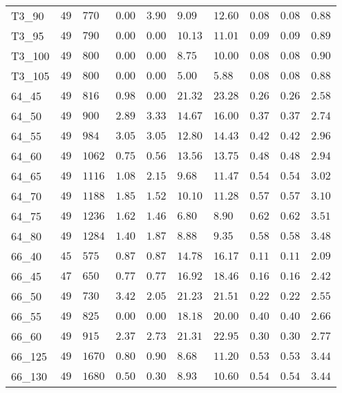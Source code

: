\begin{center}
\begin{table}[]
\begin{adjustwidth}{-0.4in}{-1in}
\begin{tabular}{|lll|l|l|ll|lll|}
T3\_90   & $49  $ & $770 $ & $\bm{0.00}$ & $3.90$ & $9.09$  & $12.60$ & $0.08$ & $0.08$   & $0.88$ \\
T3\_95   & $49  $ & $790 $ & $\bm{0.00}$ & $\bm{0.00}$ & $10.13$ & $11.01$ & $0.09$ & $0.09$   & $0.89$ \\
T3\_100  & $49  $ & $800 $ & $\bm{0.00}$ & $\bm{0.00}$ & $8.75$  & $10.00$ & $0.08$ & $0.08$   & $0.90$ \\
T3\_105  & $49  $ & $800 $ & $\bm{0.00}$ & $\bm{0.00}$ & $5.00$  & $5.88$  & $0.08$ & $0.08$   & $0.88$ \\
\hline
64\_45   & $49  $ & $816 $ & $0.98$ & $\bm{0.00}$ & $21.32$ & $23.28$ & $0.26$ & $0.26$   & $2.58$ \\
64\_50   & $49  $ & $900 $ & $2.89$ & $3.33$ & $14.67$ & $16.00$ & $0.37$ & $0.37$   & $2.74$ \\
64\_55   & $49  $ & $984 $ & $3.05$ & $3.05$ & $12.80$ & $14.43$ & $0.42$ & $0.42$   & $2.96$ \\
64\_60   & $49  $ & $1062$ & $0.75$ & $0.56$ & $13.56$ & $13.75$ & $0.48$ & $0.48$   & $2.94$ \\
64\_65   & $49  $ & $1116$ & $1.08$ & $2.15$ & $9.68$  & $11.47$ & $0.54$ & $0.54$   & $3.02$ \\
64\_70   & $49  $ & $1188$ & $1.85$ & $1.52$ & $10.10$ & $11.28$ & $0.57$ & $0.57$   & $3.10$ \\
64\_75   & $49  $ & $1236$ & $1.62$ & $1.46$ & $6.80$  & $8.90$  & $0.62$ & $0.62$   & $3.51$ \\
64\_80   & $49  $ & $1284$ & $1.40$ & $1.87$ & $8.88$  & $9.35$  & $0.58$ & $0.58$   & $3.48$ \\
\hline
66\_40   & $45  $ & $575 $ & $0.87$ & $0.87$ & $14.78$ & $16.17$ & $0.11$ & $0.11$   & $2.09$ \\
66\_45   & $47  $ & $650 $ & $0.77$ & $0.77$ & $16.92$ & $18.46$ & $0.16$ & $0.16$   & $2.42$ \\
66\_50   & $49  $ & $730 $ & $3.42$ & $2.05$ & $21.23$ & $21.51$ & $0.22$ & $0.22$   & $2.55$ \\
66\_55   & $49  $ & $825 $ & $\bm{0.00}$ & $\bm{0.00}$ & $18.18$ & $20.00$ & $0.40$ & $0.40$   & $2.66$ \\
66\_60   & $49  $ & $915 $ & $2.37$ & $2.73$ & $21.31$ & $22.95$ & $0.30$ & $0.30$   & $2.77$ \\
66\_125  & $49  $ & $1670$ & $0.80$ & $0.90$ & $8.68$  & $11.20$ & $0.53$ & $0.53$   & $3.44$ \\
66\_130  & $49  $ & $1680$ & $0.50$ & $0.30$ & $8.93$  & $10.60$ & $0.54$ & $0.54$   & $3.44$ \\

\end{tabular}
\end{adjustwidth}
\end{table}
\end{center}

